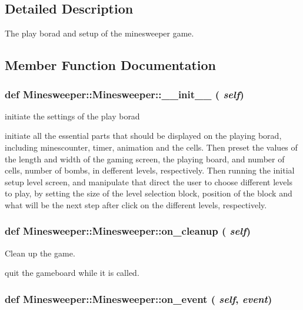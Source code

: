 \subsection{Detailed Description}
The play borad and setup of the minesweeper game. 



\subsection{Member Function Documentation}
\subsubsection{\setlength{\rightskip}{0pt plus 5cm}def Minesweeper::Minesweeper::\_\-\_\-init\_\-\_\- ( {\em self})}\label{classMinesweeper_1_1Minesweeper_48b7f8a4d250d776033053c86a521c50}


initiate the settings of the play borad 

initiate all the essential parts that should be displayed on the playing borad, including minescounter, timer, animation and the cells. Then preset the values of the length and width of the gaming screen, the playing board, and number of cells, number of bombs, in defferent levels, respectively. Then running the initial setup level screen, and manipulate that direct the user to choose different levels to play, by setting the size of the level selection block, position of the block and what will be the next step after click on the different levels, respectively. 
\subsubsection{\setlength{\rightskip}{0pt plus 5cm}def Minesweeper::Minesweeper::on\_\-cleanup ( {\em self})}\label{classMinesweeper_1_1Minesweeper_9a68b5ef853890ab090bde3a10d324cf}


Clean up the game. 

quit the gameboard while it is called. 
\subsubsection{\setlength{\rightskip}{0pt plus 5cm}def Minesweeper::Minesweeper::on\_\-event ( {\em self},  {\em event})}\label{classMinesweeper_1_1Minesweeper_802d309ec85e8b78c62f91773b944739}


